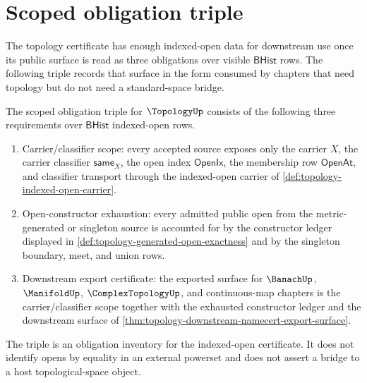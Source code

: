 \section{Scoped obligation triple}
\label{sec:topology-scoped-obligation-triple}

The topology certificate has enough indexed-open data for downstream use once its public surface is read as three obligations over visible $\mathsf{BHist}$ rows. The following triple records that surface in the form consumed by chapters that need topology but do not need a standard-space bridge.

\begin{definition}
\label{def:topology-scoped-obligation-triple}
The scoped obligation triple for $\TopologyUp$ consists of the following three requirements over $\mathsf{BHist}$ indexed-open rows.

\begin{enumerate}
\item Carrier/classifier scope: every accepted source exposes only the carrier $X$, the carrier classifier $\mathsf{same}_X$, the open index $\mathsf{OpenIx}$, the membership row $\mathsf{OpenAt}$, and classifier transport through the indexed-open carrier of \autoref{def:topology-indexed-open-carrier}.

\item Open-constructor exhaustion: every admitted public open from the metric-generated or singleton source is accounted for by the constructor ledger displayed in \autoref{def:topology-generated-open-exactness} and by the singleton boundary, meet, and union rows.

\item Downstream export certificate: the exported surface for $\BanachUp$, $\ManifoldUp$, $\ComplexTopologyUp$, and continuous-map chapters is the carrier/classifier scope together with the exhausted constructor ledger and the downstream surface of \autoref{thm:topology-downstream-namecert-export-surface}.
\end{enumerate}

The triple is an obligation inventory for the indexed-open certificate. It does not identify opens by equality in an external powerset and does not assert a bridge to a host topological-space object.
\end{definition}

